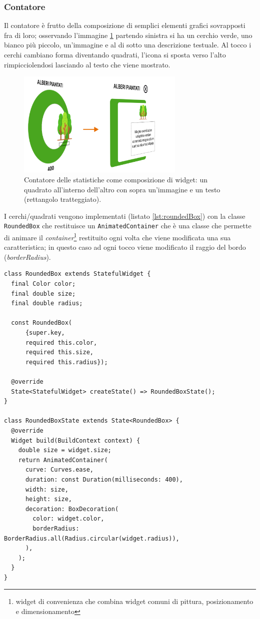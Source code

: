 \subsubsection{Contatore}
Il contatore è frutto della composizione di semplici elementi grafici sovrapposti fra di loro; osservando l'immagine \ref{fig:statCont3d} partendo sinistra si ha un cerchio verde, uno bianco più piccolo, un'immagine e al di sotto una descrizione testuale. Al tocco i cerchi cambiano forma diventando quadrati, l'icona si sposta verso l'alto rimpicciolendosi lasciando al testo che viene mostrato.
\begin{figure}
  \centering
  \includegraphics[width=8cm]{img/totem/statsItem3d.png}
  \caption[Contatore statistica come composizione di widget]{Contatore delle statistiche come composizione di widget: un quadrato all'interno dell'altro con sopra un'immagine e un testo (rettangolo tratteggiato).}
  \label{fig:statCont3d}
\end{figure}
%

I cerchi/quadrati vengono implementati (listato \ref{lst:roundedBox}) con la classe \texttt{RoundedBox} che restituisce un \texttt{AnimatedContainer} che è una classe che permette di animare il \textit{container}\footnote{widget di convenienza che combina widget comuni di pittura, posizionamento e dimensionamento} restituito ogni volta che viene modificata una sua caratteristica; in questo caso ad ogni tocco viene modificato il raggio del bordo (\textit{borderRadius}).

\begin{lstlisting}[style=FlutterStyle, caption={Classe RoundedBox per usata nella creazione del contatore delle statistiche}, label={lst:roundedBox}]
class RoundedBox extends StatefulWidget {
  final Color color;
  final double size;
  final double radius;

  const RoundedBox(
      {super.key,
      required this.color,
      required this.size,
      required this.radius});

  @override
  State<StatefulWidget> createState() => RoundedBoxState();
}

class RoundedBoxState extends State<RoundedBox> {
  @override
  Widget build(BuildContext context) {
    double size = widget.size;
    return AnimatedContainer(
      curve: Curves.ease,
      duration: const Duration(milliseconds: 400),
      width: size,
      height: size,
      decoration: BoxDecoration(
        color: widget.color,
        borderRadius: BorderRadius.all(Radius.circular(widget.radius)),
      ),
    );
  }
}
\end{lstlisting}
%

